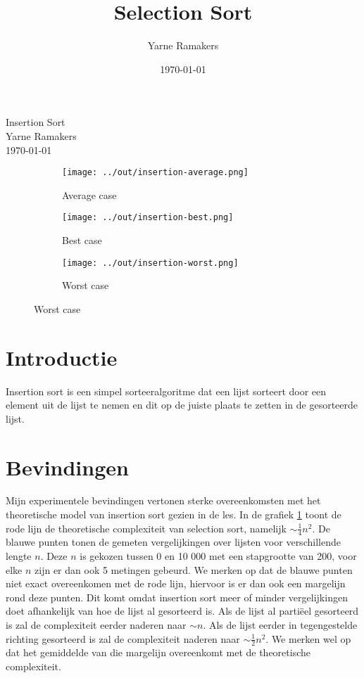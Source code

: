 \documentclass[a4paper]{article}
\title{Selection Sort}
\author{Yarne Ramakers}
\date{\today}
\begin{document}
\begin{center}
  Insertion Sort \\
  Yarne Ramakers \\
  \today \\
\end{center}

\begin{figure}[h]
  \begin{subfigure}[b]{0.3\textwidth}
    \texttt{[image: ../out/insertion-average.png]}
    \caption{Average case}
    \label{fig:insertion-avg}
  \end{subfigure}\hfill
  \begin{subfigure}[b]{0.3\textwidth}
    \texttt{[image: ../out/insertion-best.png]}
    \caption{Best case}
    \label{fig:insertion-best}
  \end{subfigure}\hfill
  \begin{subfigure}[b]{0.3\textwidth}
    \texttt{[image: ../out/insertion-worst.png]}
    \caption{Worst case}
    \label{fig:insertion-worst}
  \end{subfigure}
\end{figure}

\section{Introductie}

Insertion sort is een simpel sorteeralgoritme dat een lijst sorteert door een element uit de lijst te nemen en dit op de juiste plaats te zetten in de gesorteerde lijst.

\section{Bevindingen}
Mijn experimentele bevindingen vertonen sterke overeenkomsten met het theoretische model van insertion sort gezien in de les.
In de grafiek \ref{fig:insertion-avg} toont de rode lijn de theoretische complexiteit van selection sort, namelijk $\sim \frac{1}{4} n^2$. 
De blauwe punten tonen de gemeten vergelijkingen over lijsten voor verschillende lengte $n$. 
Deze $n$ is gekozen tussen 0 en 10 000 met een stapgrootte van 200, voor elke $n$ zijn er dan ook 5 metingen gebeurd. We merken op dat
de blauwe punten niet exact overeenkomen met de rode lijn, hiervoor is er dan ook een margelijn rond deze punten. Dit komt omdat insertion sort meer of minder vergelijkingen doet
afhankelijk van hoe de lijst al gesorteerd is. Als de lijst al partiëel gesorteerd is zal de complexiteit eerder naderen naar $\sim n$.
Als de lijst eerder in tegengestelde richting gesorteerd is zal de complexiteit naderen naar $\sim \frac{1}{2}n^2$. We merken wel op dat
het gemiddelde van die margelijn overeenkomt met de theoretische complexiteit.
\end{document}
